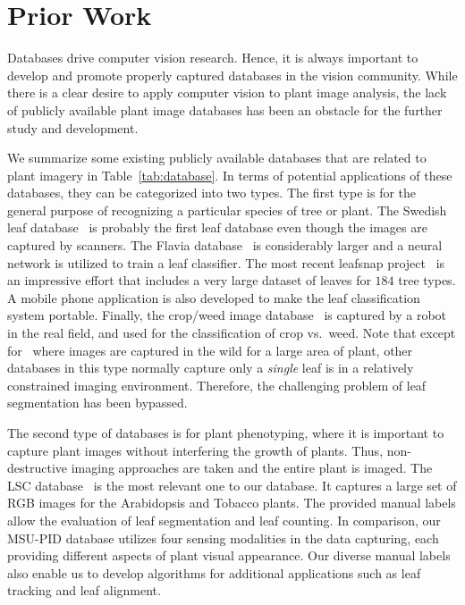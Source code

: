 \section{Prior Work}
\label{sec:prior}

Databases drive computer vision research.
Hence, it is always important to develop and promote properly captured databases in the vision community.
While there is a clear desire to apply computer vision to plant image analysis, the lack of publicly available plant image databases has been an obstacle for the further study and development.

We summarize some existing publicly available databases that are related to plant imagery in Table~\ref{tab:database}. 
In terms of potential applications of these databases, they can be categorized into two types.
The first type is for the general purpose of recognizing a particular species of tree or plant.
The Swedish leaf database~\cite{soderkvist2001computer} is probably the first leaf database even though the images are captured by scanners.
The Flavia database~\cite{wu2007leaf} is considerably larger and a neural network is utilized to train a leaf classifier.
The most recent leafsnap project~\cite{kumar2012leafsnap} is an impressive effort that includes a very large dataset of leaves for $184$ tree types.
A mobile phone application is also developed to make the leaf classification system portable. 
Finally, the crop/weed image database~\cite{haug2014crop} is captured by a robot in the real field, and used for the classification of crop vs.~weed.
Note that except for~\cite{haug2014crop} where images are captured in the wild for a large area of plant, other databases in this type normally capture only a {\it single} leaf is in a relatively constrained imaging environment.
Therefore, the challenging problem of leaf segmentation has been bypassed. 

The second type of databases is for plant phenotyping, where it is important to capture plant images without interfering the growth of plants.
Thus, non-destructive imaging approaches are taken and the entire plant is imaged. The LSC database~\cite{scharr2014annotated} is the most relevant one to our database. It captures a large set of RGB images for the Arabidopsis and Tobacco plants. The provided manual labels allow the evaluation of leaf segmentation and leaf counting. In comparison, our MSU-PID database utilizes four sensing modalities in the data capturing, each providing different aspects of plant visual appearance.
Our diverse manual labels also enable us to develop algorithms for additional applications such as leaf tracking and leaf alignment.

